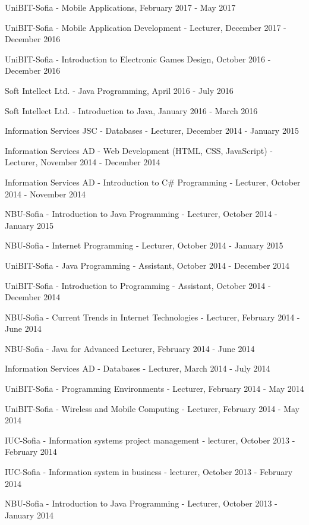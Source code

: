 \documentclass[english,a4paper]{europasscv}
\begin{document}
\begin{europasscv}
{\begin{ecvitemize}
    \item UniBIT-Sofia - Mobile Applications, February 2017 - May 2017
    \item UniBIT-Sofia - Mobile Application Development - Lecturer, December 2017 - December 2016
    \item UniBIT-Sofia - Introduction to Electronic Games Design, October 2016 - December 2016
    \item Soft Intellect Ltd. - Java Programming, April 2016 - July 2016
    \item Soft Intellect Ltd. - Introduction to Java, January 2016 - March 2016
    \item Information Services JSC - Databases - Lecturer, December 2014 - January 2015
    \item Information Services AD - Web Development (HTML, CSS, JavaScript) - Lecturer, November 2014 - December 2014
    \item Information Services AD - Introduction to C\# Programming - Lecturer, October 2014 - November 2014
    \item NBU-Sofia - Introduction to Java Programming - Lecturer, October 2014 - January 2015
    \item NBU-Sofia - Internet Programming - Lecturer, October 2014 - January 2015
    \item UniBIT-Sofia - Java Programming - Assistant, October 2014 - December 2014
    \item UniBIT-Sofia - Introduction to Programming - Assistant, October 2014 - December 2014
    \item NBU-Sofia - Current Trends in Internet Technologies - Lecturer, February 2014 - June 2014
    \item NBU-Sofia - Java for Advanced Lecturer, February 2014 - June 2014
    \item Information Services AD - Databases - Lecturer, March 2014 - July 2014
    \item UniBIT-Sofia - Programming Environments - Lecturer, February 2014 - May 2014
    \item UniBIT-Sofia - Wireless and Mobile Computing - Lecturer, February 2014 - May 2014
    \item IUC-Sofia - Information systems project management - lecturer, October 2013 - February 2014
    \item IUC-Sofia - Information system in business - lecturer, October 2013 - February 2014
    \item NBU-Sofia - Introduction to Java Programming - Lecturer, October 2013 - January 2014

\end{ecvitemize}}
\end{europasscv}
\end{document}
